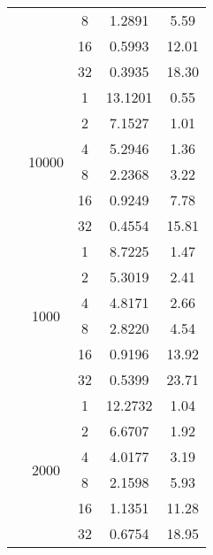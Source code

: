 \begin{tabularx}{\textwidth}{@{} c c c c c @{}}
                            &                       & 8  & 1.2891 & 5.59  \\
                            &                       & 16 & 0.5993 & 12.01 \\
                            &                       & 32 & 0.3935 & 18.30 \\
                            \cmidrule{2-5}
                            & \multirow{6}{*}{10000} & 1  & 13.1201 & 0.55 \\
                            &                        & 2  & 7.1527  & 1.01 \\
                            &                        & 4  & 5.2946  & 1.36 \\
                            &                        & 8  & 2.2368  & 3.22 \\
                            &                        & 16 & 0.9249  & 7.78 \\
                            &                        & 32 & 0.4554  & 15.81 \\
\midrule\enlargethispage{-\baselineskip}
    \multirow{24}{*}{40000} & \multirow{6}{*}{1000} & 1  & 8.7225 & 1.47  \\
                            &                       & 2  & 5.3019 & 2.41  \\
                            &                       & 4  & 4.8171 & 2.66  \\
                            &                       & 8  & 2.8220 & 4.54  \\
                            &                       & 16 & 0.9196 & 13.92 \\
                            &                       & 32 & 0.5399 & 23.71 \\
                            \cmidrule{2-5}
                            & \multirow{6}{*}{2000} & 1  & 12.2732 & 1.04  \\
                            &                       & 2  & 6.6707  & 1.92  \\
                            &                       & 4  & 4.0177  & 3.19  \\
                            &                       & 8  & 2.1598  & 5.93  \\
                            &                       & 16 & 1.1351  & 11.28 \\
                            &                       & 32 & 0.6754  & 18.95 \\
                            \cmidrule{2-5}

\end{tabularx}
